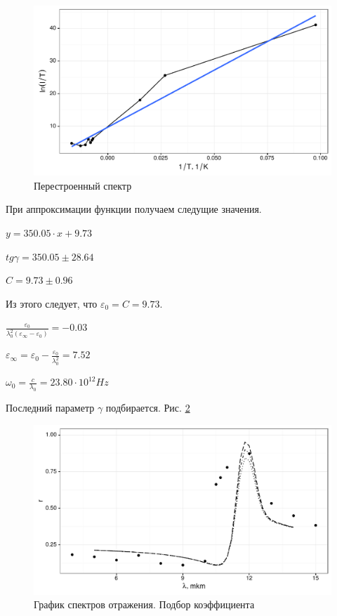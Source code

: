 \documentclass[a4paper,11pt]{report}\usepackage[]{graphicx}\usepackage[]{color}
\makeatletter
\def\maxwidth{ %
  \ifdim\Gin@nat@width>\linewidth
    \linewidth
  \else
    \Gin@nat@width
  \fi
}
\newenvironment{knitrout}{}{} %
\makeatother
\begin{document}
\begin{knitrout}
\color{fgcolor}\begin{figure}[!h]
\includegraphics[width=\maxwidth]{figure/rgraph52-1} \caption[Перестроенный спектр ]{Перестроенный спектр }\label{fig:rgraph52}
\end{figure}


\end{knitrout}

При аппроксимации функции получаем следущие значения.

$y = 350.05 \cdot x + 9.73 $

$tg \gamma = 350.05 \pm 28.64$

$C = 9.73 \pm 0.96 $

Из этого следует, что $\varepsilon_0 = C = 9.73$.

$ \frac{\varepsilon_0}{\lambda_0^2 (\varepsilon_{\infty} - \varepsilon_0)}= \ensuremath{-0.03}$

$\varepsilon_{\infty} = \varepsilon_0 - \frac{\varepsilon_0}{\lambda_0^2}   =   7.52$

$\omega_0 = \frac{c}{\lambda_0} = 23.80 \cdot 10^{12} Hz$

Последний параметр $\gamma$ подбирается. Рис. \ref{fig:rgraph53}

\begin{knitrout}
\color{fgcolor}\begin{figure}[!h]
\includegraphics[width=\maxwidth]{figure/rgraph53-1} \caption[График спектров отражения]{График спектров отражения. Подбор коэффициента }\label{fig:rgraph53}
\end{figure}


\end{knitrout}
\end{document}
